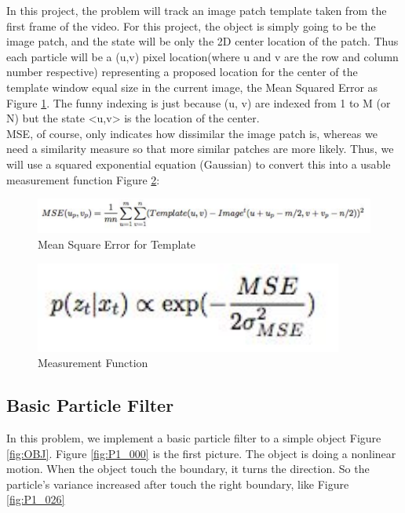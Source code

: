 \documentclass[10pt, conference, compsocconf]{IEEEtran}
\begin{document}
In this project, the problem will track an image patch template taken from the first frame of the video. For this project, the object is simply going to be the image patch, and the state will be only the 2D center location of the patch. Thus each particle will be a (u,v) pixel location(where u and v are the row and column number respective) representing a proposed location for the center of the template window equal size in the current image, the Mean Squared Error as Figure \ref{fig:mse}. The funny indexing is just because (u, v) are indexed from 1 to M (or N) but the state <u,v> is the location of the center.\\
MSE, of course, only indicates how dissimilar the image patch is, whereas we need a similarity measure so that more similar patches are more likely. Thus, we will use a squared exponential equation (Gaussian) to convert this into a usable measurement function Figure \ref{fig:measure}: 

\begin{figure}[H]
	\centering
	\includegraphics[scale = 0.20]{image/mse.png}
	\caption{Mean Square Error for Template}
	\label{fig:mse}
\end{figure}

\begin{figure}[H]
	\centering
	\includegraphics[scale = 0.30]{image/measure.png}
	\caption{Measurement Function }
	\label{fig:measure}
\end{figure}

\subsection{Basic Particle Filter}

In this problem, we implement a basic particle filter to a simple object Figure \ref{fig:OBJ}. Figure \ref{fig:P1_000} is the first picture. The object is doing a nonlinear motion. When the object touch the boundary, it turns the direction. So the particle's variance increased after touch the right boundary, like Figure \ref{fig:P1_026} 
\end{document}
